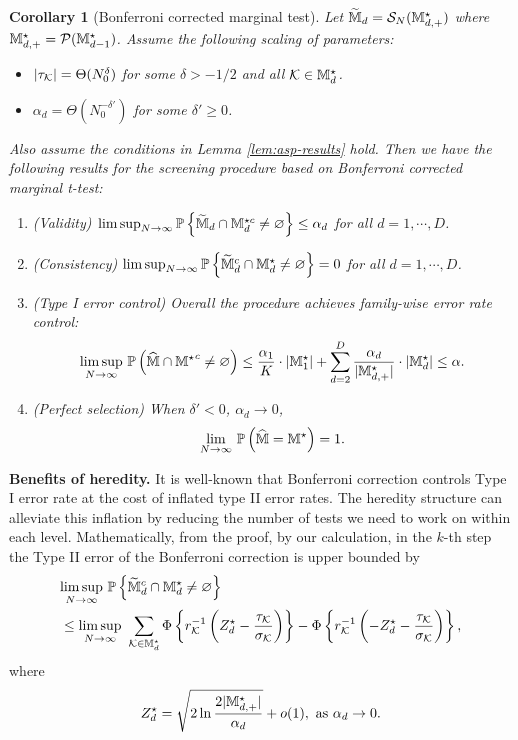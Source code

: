 \documentclass[12pt]{article}
\newtheorem{corollary}{Corollary}
\begin{document}
\begin{corollary}[Bonferroni corrected marginal test]
Let $\widetilde{{\mathbb{M}}}_{d} = {\mathcal{S}}_N({\mathbb{M}}^{\star}_{d,+})$ where ${\mathbb{M}}^{\star}_{d,+} = {\mathcal{P}}({\mathbb{M}}^{\star}_{d-1})$. Assume the following scaling of parameters:
\begin{itemize}
    \item $|\tau_{\mathcal{K}}| =  \Theta(N_0^\delta)$ for some $\delta > -1/2$ and all ${\mathcal{K}}\in{\mathbb{M}}_d^\star$.
    \item ${\alpha_d} =  \Theta(N_0^{-\delta'})$ for some $\delta'\ge 0$.
\end{itemize} 
Also assume the conditions in Lemma \ref{lem:asp-results} hold. Then we have
the following results for the  screening procedure based on Bonferroni corrected marginal t-test:
\begin{enumerate}
    \item (Validity) $\lim\sup_{N\to\infty}{\mathbb{P}}\left\{\widetilde{{\mathbb{M}}}_{d}\cap{\mathbb{M}}^{\star c}_d\neq \varnothing\right\}\le \alpha_d$ for all $d=1,\cdots,D$.
    \item (Consistency) $\lim\sup_{N\to\infty}{\mathbb{P}}\left\{\widetilde{{\mathbb{M}}}_{d}^c\cap{\mathbb{M}}^{\star}_d\neq \varnothing\right\} = 0$ for all $d=1,\cdots,D$.
    \item (Type I error control) Overall the procedure achieves family-wise error rate control:
    \begin{align*}
    \underset{N\to\infty}{\lim\sup}~{\mathbb{P}}\left(\widehat{{\mathbb{M}}}\cap{{\mathbb{M}}^\star}^c\neq \varnothing\right)
    \le 
    \frac{\alpha_1}{K}\cdot|{\mathbb{M}}_1^\star| + \sum_{d=2}^D \frac{\alpha_d}{|{\mathbb{M}}^\star_{d,+}|}\cdot|{\mathbb{M}}^\star_d| \le \alpha.
    \end{align*}
    \item (Perfect selection) When $\delta'<0$, $\alpha_d\to0$, 
    \begin{align*}
    \underset{N\to\infty}{\lim}~{\mathbb{P}}\left(\widehat{{\mathbb{M}}} = {{\mathbb{M}}^\star}  \right)
     = 1.
    \end{align*}
\end{enumerate}

\end{corollary}

\textbf{Benefits of heredity.} It is well-known that Bonferroni correction controls Type I error rate at the cost of inflated type II error rates. The heredity structure can alleviate this inflation by reducing the number of tests we need to work on within each level. Mathematically, from the proof, by our calculation, in the $k$-th step the Type II error of the Bonferroni correction is upper bounded by 
\begin{align}\label{eqn:type-II}
        &\underset{N\to\infty}{\lim\sup}~{\mathbb{P}}\left\{\widetilde{{\mathbb{M}}}^c_{d}\cap{\mathbb{M}}^{\star }_d\neq \varnothing\right\} \notag\\
        & \le \underset{N\to\infty}{\lim\sup}~\sum_{{\mathcal{K}}\in{\mathbb{M}}_d^\star} \Phi\left\{r_{\mathcal{K}}^{-1}\left(Z_d^\star - \frac{\tau_{\mathcal{K}}}{\sigma_{\mathcal{K}}}\right)\right\} - \Phi\left\{r_{\mathcal{K}}^{-1}\left(-Z_d^\star - \frac{\tau_{\mathcal{K}}}{\sigma_{\mathcal{K}}}\right)\right\},
\end{align}
where
\begin{align*}
    Z_d^\star = \sqrt{2\ln\frac{2|{\mathbb{M}}_{d,+}^\star|}{\alpha_d}} + o(1), \text{ as } \alpha_d \to 0.
\end{align*}
\end{document}
